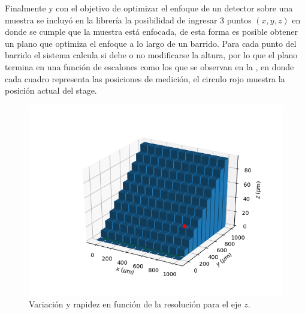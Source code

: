 \newpage
Finalmente y con el objetivo de optimizar el enfoque de un detector sobre una muestra se incluyó en la librería la posibilidad de ingresar 3 puntos $(x, y, z)$ en donde se cumple que la muestra está enfocada, de esta forma es posible obtener un plano que optimiza el enfoque a lo largo de un barrido. Para cada punto del barrido el sistema calcula si debe o no modificarse la altura, por lo que el plano termina en una función de escalones como los que se observan en la , en donde cada cuadro representa las posiciones de medición, el circulo rojo muestra la posición actual del stage.
\begin{figure}[h]
	\centering
	\includegraphics[width=\linewidth]{figures/plane.png}
	\caption{Variación y rapidez en función de la resolución para el eje $z$.}
	\label{fig:plane}
\end{figure}
